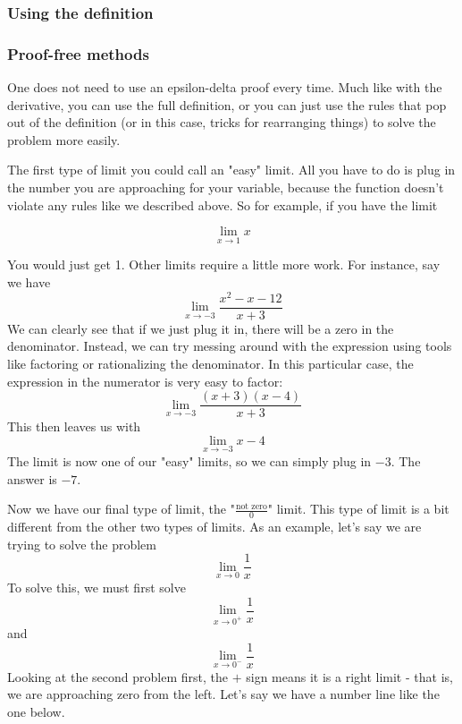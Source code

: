 \subsubsection{Using the definition}



\subsubsection{Proof-free methods}

One does not need to use an epsilon-delta proof every time. Much like with the derivative, you can use the full definition, or you can just use the rules that pop out of the definition (or in this case, tricks for rearranging things) to solve the problem more easily.

The first type of limit you could call an "easy" limit. 
All you have to do is plug in the number you are approaching for your variable, because the function doesn't violate any rules like we described above. 
So for example, if you have the limit

\begin{equation*}
    \lim\limits_{x\rightarrow 1} x
\end{equation*}

You would just get 1. 
Other limits require a little more work. For instance, say we have
\begin{equation*}
    \lim\limits_{x\rightarrow -3}\frac{x^2-x-12}{x+3}
\end{equation*}
We can clearly see that if we just plug it in, there will be a zero in the denominator. 
Instead, we can try messing around with the expression using tools like factoring or rationalizing the denominator. 
In this particular case, the expression in the numerator is very easy to factor:
\begin{equation*}
    \lim\limits_{x\rightarrow -3}\frac{(x+3)(x-4)}{x+3}
\end{equation*}
This then leaves us with
\begin{equation*}
    \lim\limits_{x\rightarrow -3}x-4
\end{equation*}
The limit is now one of our "easy" limits, so we can simply plug in $-3$. The answer is $-7$.

Now we have our final type of limit, the "$\frac{\text{not zero}}{0}$" limit. 
This type of limit is a bit different from the other two types of limits. As an example, let's say we are trying to solve the problem
\begin{equation*}
    \lim\limits_{x\rightarrow 0}\frac{1}{x}
\end{equation*}
To solve this, we must first solve
\begin{equation*}
    \lim\limits_{x\rightarrow 0^+}\frac{1}{x}
\end{equation*}
and
\begin{equation*}
    \lim\limits_{x\rightarrow 0^-}\frac{1}{x}
\end{equation*}
Looking at the second problem first, the $+$ sign means it is a right limit - that is, we are approaching zero from the left. Let's say we have a number line like the one below.

